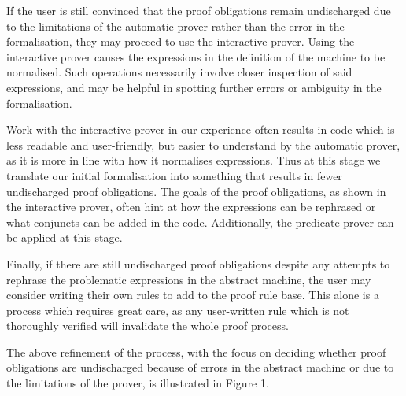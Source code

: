 \documentclass[12pt,journal,duplex]{IEEEtran}
\begin{document}
	If the user is still convinced that the proof obligations remain undischarged due to the limitations of the automatic prover rather than the error in the formalisation, they may proceed to use the interactive prover. Using the interactive prover causes the expressions in the definition of the machine to be normalised. Such operations necessarily involve closer inspection of said expressions, and may be helpful in spotting further errors or ambiguity in the formalisation.

	Work with the interactive prover in our experience often results in code which is less readable and user-friendly, but easier to understand by the automatic prover, as it is more in line with how it normalises expressions. Thus at this stage we translate our initial formalisation into something that results in fewer undischarged proof obligations. The goals of the proof obligations, as shown in the interactive prover, often hint at how the expressions can be rephrased or what conjuncts can be added in the code. Additionally, the predicate prover can be applied at this stage.

	Finally, if there are still undischarged proof obligations despite any attempts to rephrase the problematic expressions in the abstract machine, the user may consider writing their own rules to add to the proof rule base. This alone is a process which requires great care, as any user-written rule which is not thoroughly verified will invalidate the whole proof process.

	The above refinement of the process, with the focus on deciding whether proof obligations are undischarged because of errors in the abstract machine or due to the limitations of the prover, is illustrated in Figure 1.
	
\end{document}
